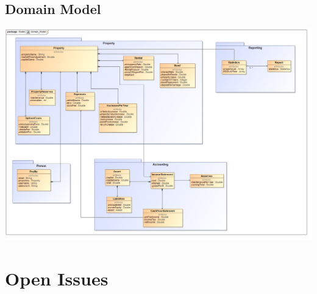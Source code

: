 \documentclass[a4paper,12pt]{article}
\begin{document}
\subsection{Domain Model}
\includegraphics[width=1\textwidth]{./domainModel/domain_Model.PNG}


\newpage
\section{Open Issues}
\end{document}
